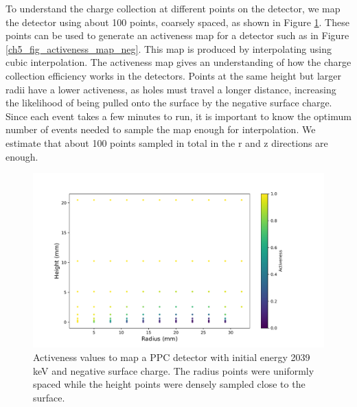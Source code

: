 To understand the charge collection at different points on the detector, we map the detector using about 100 points, coarsely spaced, as shown in Figure \ref{ch5_fig_activeness_points_neg}. These points can be used to generate an activeness map for a detector such as in Figure \ref{ch5_fig_activeness_map_neg}. This map is produced by interpolating using cubic interpolation. The activeness map gives an understanding of how the charge collection efficiency works in the detectors. Points at the same height but larger radii have a lower activeness, as holes must travel a longer distance, increasing the likelihood of being pulled onto the surface by the negative surface charge. Since each event takes a few minutes to run, it is important to know the optimum number of events needed to sample the map enough for interpolation. We estimate that about 100 points sampled in total in the r and z directions are enough.

\begin{figure}%
\includegraphics[trim={0cm 0.5cm 3.2cm 1.15cm},clip,width=0.95\linewidth]{ch5/figs/activenss_map_ponama_1_-0.3_5000.pdf}
\caption{Activeness values to map a PPC detector \ehd with initial energy 2039 keV and negative surface charge. The radius points were uniformly spaced while the height points were densely sampled close to the surface.}
\label{ch5_fig_activeness_points_neg}
\end{figure}

